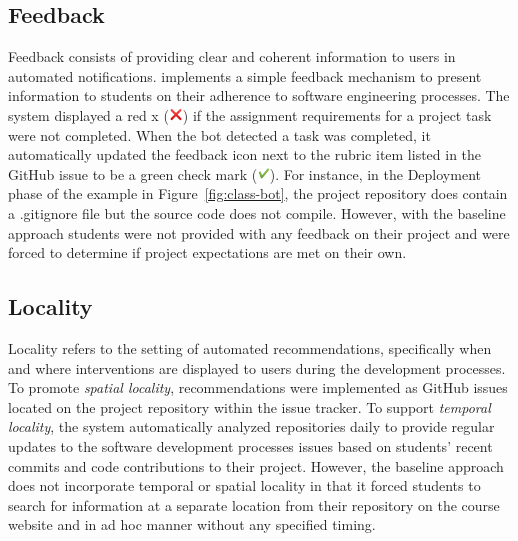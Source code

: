 \subsection*{Feedback}

Feedback consists of providing clear and coherent information to users in automated notifications. \tooltwo implements a simple feedback mechanism to present information to students on their adherence to software engineering processes. The system displayed a red x (\includegraphics[height=1em]{Chapter-6/images/x.png}) if the assignment requirements for a project task were not completed. When the bot detected a task was completed, it automatically updated the feedback icon next to the rubric item listed in the GitHub issue to be a green check mark (\includegraphics[height=1em]{Chapter-6/images/check.png}). For instance, in the Deployment phase of the \tooltwo example in Figure~\ref{fig:class-bot}, the project repository does contain a .gitignore file but the source code does not compile. However, with the baseline approach students were not provided with any feedback on their project and were forced to determine if project expectations are met on their own.


\subsection*{Locality}

Locality refers to the setting of automated recommendations, specifically when and where interventions are displayed to users during the development processes. To promote \textit{spatial locality}, \tooltwo recommendations were implemented as GitHub issues located on the project repository within the issue tracker. To support \textit{temporal locality}, the system automatically analyzed repositories daily to provide regular updates to the \tooltwo software development processes issues based on students' recent commits and code contributions to their project. However, the baseline approach does not incorporate temporal or spatial locality in that it forced students to search for information at a separate location from their repository on the course website and in ad hoc manner without any specified timing.



